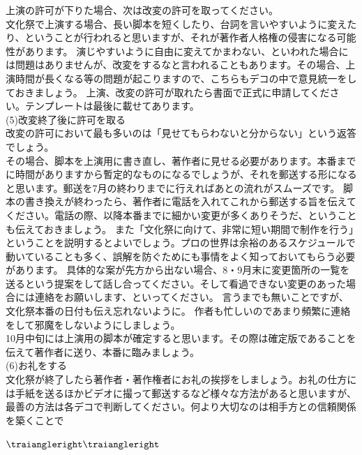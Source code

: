 \documentclass[book, twoside, paper=b5j, fleqn, jafontsize=9pt, jafontscale=1, head_space=22mm, foot_space=9mm, fore-edge=16mm, gutter=25mm, hanging_punctuation]{jlreq}
\newcommand{\subsubsubsection}[1]{\(\traiangleright\traiangleright\)~\gothic{#1}}
\newcommand{\gothic}[1]{\textgt{\textsf{#1}}}
\begin{document}
上演の許可が下りた場合、次は改変の許可を取ってください。\\
文化祭で上演する場合、長い脚本を短くしたり、台詞を言いやすいように変えたり、ということが行われると思いますが、それが著作者人格権の侵害になる可能性があります。
演じやすいように自由に変えてかまわない、といわれた場合には問題はありませんが、改変をするなと言われることもあります。その場合、上演時間が長くなる等の問題が起こりますので、こちらもデコの中で意見統一をしておきましょう。
上演、改変の許可が取れたら書面で正式に申請してください。テンプレートは最後に載せてあります。
\\
(5)改変終了後に許可を取る\\
改変の許可において最も多いのは「見せてもらわないと分からない」という返答でしょう。\\
その場合、脚本を上演用に書き直し、著作者に見せる必要があります。本番までに時間がありますから暫定的なものになるでしょうが、それを郵送する形になると思います。郵送を7月の終わりまでに行えればあとの流れがスムーズです。
脚本の書き換えが終わったら、著作者に電話を入れてこれから郵送する旨を伝えてください。電話の際、以降本番までに細かい変更が多くありそうだ、ということも伝えておきましょう。
また「文化祭に向けて、非常に短い期間で制作を行う」ということを説明するとよいでしょう。プロの世界は余裕のあるスケジュールで動いていることも多く、誤解を防ぐためにも事情をよく知っておいてもらう必要があります。
具体的な案が先方から出ない場合、8・9月末に\footnotemark[1] 変更箇所の一覧を送るという提案をして話し合ってください。そして看過できない変更のあった場合には連絡をお願いします、といってください。
言うまでも無いことですが、文化祭本番の日付も伝え忘れないように。
作者も忙しいのであまり頻繁に連絡をして邪魔をしないようにしましょう。\\
10月中旬には上演用の脚本が確定すると思います。その際は確定版であることを伝えて著作者に送り、本番に臨みましょう。
\\
(6)お礼をする\\
文化祭が終了したら著作者・著作権者にお礼の挨拶をしましょう。お礼の仕方には手紙を送るほかビデオに撮って郵送するなど様々な方法があると思いますが、最善の方法は各デコで判断してください。何より大切なのは相手方との信頼関係を築くことで

\subsubsubsection{「0」の有効数字}
\end{document}
